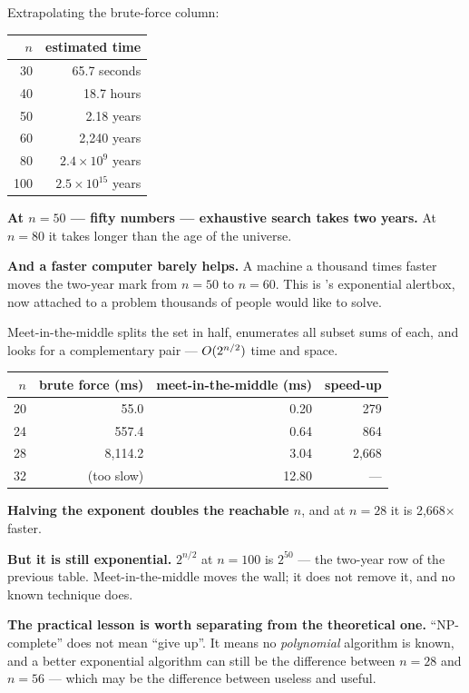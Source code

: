 \begin{worked}
Extrapolating the brute-force column:

\begin{center}
\begin{tabular}{@{}rr@{}}
\toprule
\rowcolor{primary!15}
$n$ & estimated time \\
\midrule
 30 & 65.7 seconds \\
 40 & 18.7 hours \\
 50 & 2.18 years \\
 60 & 2{,}240 years \\
 80 & $2.4 \times 10^{9}$ years \\
100 & $2.5 \times 10^{15}$ years \\
\bottomrule
\end{tabular}
\end{center}

\smallskip
\textbf{At $n = 50$ --- fifty numbers --- exhaustive search takes two years.}
At $n = 80$ it takes longer than the age of the universe.

\smallskip
\textbf{And a faster computer barely helps.} A machine a thousand times faster
moves the two-year mark from $n = 50$ to $n = 60$. This is 's
exponential alertbox, now attached to a problem thousands of people would like
to solve.
\end{worked}

\begin{worked}
Meet-in-the-middle splits the set in half, enumerates all subset sums of each,
and looks for a complementary pair --- $O(2^{n/2})$ time and space.

\begin{center}
\begin{tabular}{@{}rrrr@{}}
\toprule
\rowcolor{primary!15}
$n$ & brute force (ms) & meet-in-the-middle (ms) & speed-up \\
\midrule
20 &      55.0 &  0.20 &   279 \\
24 &     557.4 &  0.64 &   864 \\
28 &   8{,}114.2 &  3.04 & 2{,}668 \\
32 & (too slow) & 12.80 & --- \\
\bottomrule
\end{tabular}
\end{center}

\smallskip
\textbf{Halving the exponent doubles the reachable $n$}, and at $n = 28$ it is
2{,}668$\times$ faster.

\smallskip
\textbf{But it is still exponential.} $2^{n/2}$ at $n = 100$ is $2^{50}$ ---
the two-year row of the previous table. Meet-in-the-middle moves the wall; it
does not remove it, and no known technique does.

\smallskip
\textbf{The practical lesson is worth separating from the theoretical one.}
``NP-complete'' does not mean ``give up''. It means no \emph{polynomial}
algorithm is known, and a better exponential algorithm can still be the
difference between $n = 28$ and $n = 56$ --- which may be the difference
between useless and useful.
\end{worked}


